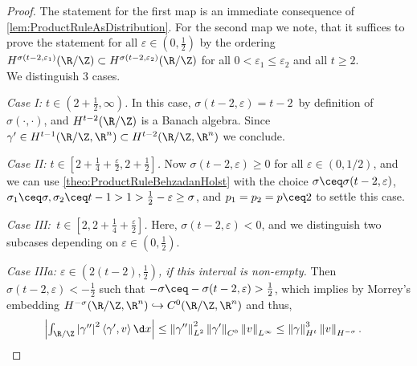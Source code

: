 \begin{proof}
    The statement for the first map is an immediate consequence of \cref{lem:ProductRuleAsDistribution}. For the second map we note, that it suffices to prove the statement for all $ \varepsilon\in (0,\frac{1}{2}) $ by the ordering $ H^{\sigma(t-2,\varepsilon_1)}(\R/\Z)\subset H^{\sigma(t-2,\varepsilon_2)}(\R/\Z)$ for all $ 0<\varepsilon_1\le \varepsilon_2 $ and all $ t\ge 2 $. \\
    We distinguish 3 cases. 

    \textit{{Case I:} $t\in (2+\frac{1}{2},\infty)$.}
    In this case, $ \sigma(t-2,\varepsilon)=t-2 \,$ by definition of $ \sigma(\cdot,\cdot) $, and $ H^{t-2}(\R/\Z) $ is a Banach algebra. Since $ \gamma'\in H^{t-1}(\R/\Z,\R^n)\subset H^{t-2}(\R/\Z,\R^n) $ we conclude. 

    \textit{{Case II:} $t\in [2+\frac{1}{4}+\frac{\varepsilon}{2},2+\frac{1}{2}]$.}
    Now $ \sigma(t-2,\varepsilon)\ge0 $ for all $ \varepsilon\in(0,1/2) $, and we can use \cref{theo:ProductRuleBehzadanHolst} with the choice $ \sigma\ceq \sigma(t-2,\varepsilon) $, $ \sigma_1\ceq \sigma, \sigma_2\ceq t-1>1>\frac{1}{2}-\varepsilon\ge \sigma $, and $ p_1=p_2=p \ceq 2$ to settle this case. 

    \textit{{Case III:}\, $t\in [2,2+\frac{1}{4}+\frac{\varepsilon}{2}]$.} Here, $ \sigma(t-2,\varepsilon)<0 $, and we distinguish two subcases depending on $ \varepsilon\in (0,\frac{1}{2}) $.

    \textit{{Case IIIa:} $\varepsilon\in (2(t-2),\frac{1}{2})$, if this interval is non-empty.}
    Then $ \sigma(t-2,\varepsilon) <-\frac{1}{2}$ such that $ -\sigma\ceq-\sigma(t-2,\varepsilon)>\frac{1}{2} $, which implies by Morrey's embedding $ H^{-\sigma}(\R/\Z,\R^n)\hookrightarrow C^0(\R/\Z,\R^n) $ and thus,
    \begin{align*}\textstyle
        \left|\int_{\R/\Z}\left|\gamma'' \right|^2 \left\langle \gamma',v \right\rangle \d x \right|&\le \left\|\gamma'' \right\|^2_{L^2}\left\|\gamma' \right\|_{C^0}\left\|v \right\|_{L^\infty}
        \le \left\|\gamma \right\|^3_{H^t}\left\|v \right\|_{H^{-\sigma}}.
    \end{align*}


\end{proof}
